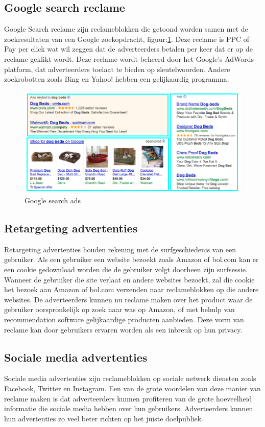 \documentclass[pdftex,a4paper,12pt,twoside]{report}
\begin{document}
\subsection{Google search reclame }
\label{sec Google search reclame }
Google Search reclame zijn reclameblokken die getoond worden samen met de zoekresultaten van een Google zoekopdracht, figuur:\ref{fig: Google-Search-ad}. Deze reclame is PPC of Pay per click wat wil zeggen dat de adverteerders betalen per keer dat er op de reclame geklikt wordt. Deze reclame wordt beheerd door het Google’s AdWords platform, dat adverteerders toelaat te bieden op sleutelwoorden. Andere zoekrobotten zoals Bing en Yahoo! hebben een gelijkaardig programma.
\begin{figure}[h!]
\centering
\includegraphics[width=12cm]{img/example-of-google-ads}
\caption{Google search ads}
\label{fig: Google-Search-ad}
\end{figure}
\subsection{Retargeting advertenties }
\label{sec Retargeting advertenties }
Retargeting advertenties houden rekening met de surfgeschiedenis van een gebruiker. Als een gebruiker een website bezoekt zoals Amazon of bol.com kan er een cookie gedownload worden die de gebruiker volgt doorheen zijn surfsessie. Wanneer de gebruiker die site verlaat en andere websites bezoekt, zal die cookie het bezoek aan Amazon of bol.com verzenden naar reclameblokken op die andere websites. De adverteerders kunnen nu reclame maken over het product waar de gebruiker oorspronkelijk op zoek naar was op Amazon, of met behulp van recommendation software gelijkaardige producten aanbieden. Deze vorm van reclame kan door gebruikers ervaren worden als een inbreuk op hun privacy.
\subsection{Sociale media advertenties }
\label{sec Sociale media advertenties }
Sociale media advertenties zijn reclameblokken op sociale netwerk diensten zoals Facebook, Twitter en Instagram. Een van de grote voordelen van deze manier van reclame maken is dat adverteerders kunnen profiteren van de grote hoeveelheid informatie die sociale media hebben over hun gebruikers. Adverteerders kunnen hun advertenties zo veel beter richten op het juiste doelpubliek.
\end{document}
